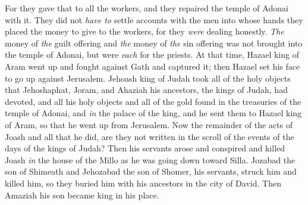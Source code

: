 \begin{biblechapter}
\verse For they gave that to all the workers, and they repaired the temple of Adonai with it.
\verse They did not \textit{have to} settle accounts with the men into whose hands they placed the money to give to the workers, for they \textit{were} dealing honestly.
\verse \textit{The} money of \textit{the} guilt offering and \textit{the} money of \textit{the} sin offering was not brought into the temple of Adonai, but were \textit{each} for the priests.
 At that time, Hazael king of Aram went up and fought against Gath and captured it; then Hazael set his face to go up against Jerusalem.
\verse Jehoash king of Judah took all of the holy objects that Jehoshaphat, Joram, and Ahaziah his ancestors, the kings of Judah, had devoted, and all his holy objects and all of the gold found in the treasuries of the temple of Adonai, and \textit{in} the palace of the king, and he sent them to Hazael king of Aram, so that he went up from Jerusalem.
\verse Now the remainder of the acts of Joash and all that he did, are they not written in the scroll of the events of the days of the kings of Judah?
\verse Then his servants arose and conspired and killed Joash \textit{in} the house of the Millo as he was going down toward Silla.
\verse Jozabad the son of Shimeath and Jehozabad the son of Shomer, his servants, struck him and killed him, so they buried him with his ancestors in the city of David. Then Amaziah his son became king in his place.
\end{biblechapter}

